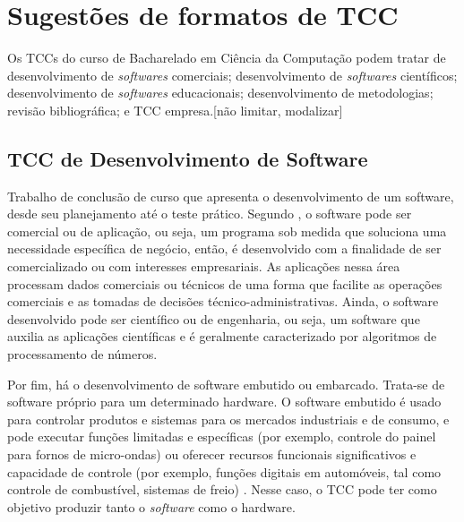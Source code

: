\section{Sugestões de formatos de TCC}\label{sec:SUGESTOESTCC}
Os TCCs do curso de Bacharelado em Ciência da Computação podem tratar de desenvolvimento de \textit{softwares} comerciais; desenvolvimento de \textit{softwares} científicos; desenvolvimento de \textit{softwares} educacionais; desenvolvimento de metodologias; revisão bibliográfica; e TCC empresa.[não limitar, modalizar]

\subsection{TCC de Desenvolvimento de Software}\label{sec:DesenvolvimentoSof}

Trabalho de conclusão de curso que apresenta o desenvolvimento de um software, desde seu planejamento até o teste prático. Segundo \textcite{Pressman2011}, o software pode ser comercial ou de aplicação, ou seja, um programa sob medida que soluciona uma necessidade específica de negócio, então, é desenvolvido com a finalidade de ser comercializado ou com interesses empresariais. As aplicações nessa área processam dados comerciais ou técnicos de uma forma que facilite as operações comerciais e as tomadas de decisões técnico-administrativas. Ainda, o software desenvolvido pode ser científico ou de engenharia, ou seja, um software que auxilia as aplicações científicas e é geralmente caracterizado por algoritmos de processamento de números. 

Por fim, há o desenvolvimento de software embutido ou embarcado. Trata-se de software próprio para um determinado hardware. O software embutido é usado para controlar produtos e sistemas para os mercados industriais e de consumo, e pode executar funções limitadas e específicas (por exemplo, controle do painel para fornos de micro-ondas) ou oferecer recursos funcionais significativos e capacidade de controle (por exemplo, funções digitais em automóveis, tal como controle de combustível, sistemas de freio) \cite{Pressman2011}. Nesse caso, o TCC pode ter como objetivo produzir tanto o \textit{software} como o hardware.

